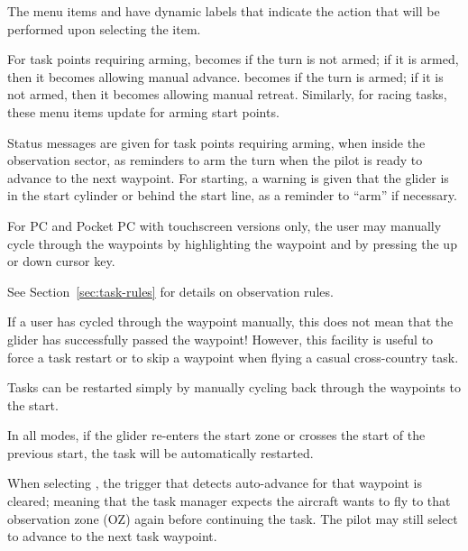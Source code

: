 The menu items \blink{} and
\blink{} have dynamic labels that
indicate the action that will be performed upon selecting the item.

For task points requiring arming, \blink{} becomes  if the turn is not armed; if it
is armed, then it becomes  allowing manual
advance.   \blink{} becomes  if the turn is armed; if it
is not armed, then it becomes  allowing manual
retreat.  Similarly, for racing tasks, these menu items update for arming
start points. 

Status messages are given for task points requiring arming, when
inside the observation sector, as reminders to arm the turn when the
pilot is ready to advance to the next waypoint. For starting, a
warning is given that the glider is in the start cylinder or behind
the start line, as a reminder to ``arm'' if necessary.

For PC and Pocket PC with touchscreen versions only, the user may
manually cycle through the waypoints by highlighting the waypoint
{\InfoBox} and by pressing the up or down cursor key.

See Section~\ref{sec:task-rules} for details on observation rules.

If a user has cycled through the waypoint manually, this does not mean
that the glider has successfully passed the waypoint!  However, this
facility is useful to force a task restart or to skip a waypoint when
flying a casual cross-country task.

\tip Tasks can be restarted simply by manually cycling back through the
waypoints to the start.

In all modes, if the glider re-enters the start zone or crosses the
start of the previous start, the task will be automatically restarted. 

When selecting , the trigger that detects
auto-advance for that waypoint is cleared; meaning that the task
manager expects the aircraft wants to fly to that observation zone (OZ)
again before continuing the task.  The pilot may still select  to advance to the next task waypoint.

